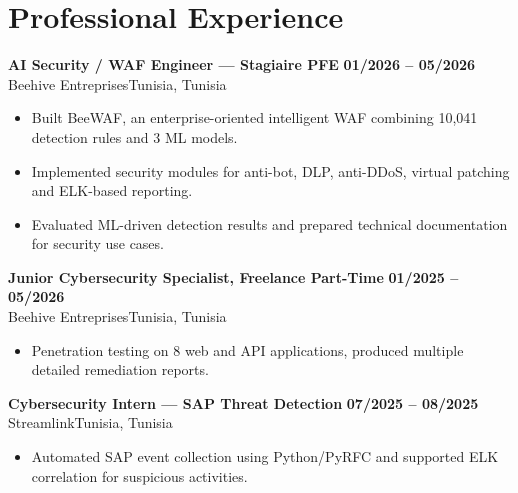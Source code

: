 \documentclass[a4paper,10pt]{article}
\newcommand{\cventry}[4]{\textbf{#1} \hfill \textbf{#4}\\[1pt]#2{\ifx\relax#3\relax\else, #3\fi}\par\vspace{2pt}}
\begin{document}
\section{Professional Experience}
\cventry{AI Security / WAF Engineer --- Stagiaire PFE}{Beehive Entreprises}{Tunisia}{01/2026 -- 05/2026}
\begin{itemize}
  \item Built BeeWAF, an enterprise-oriented intelligent WAF combining 10,041 detection rules and 3 ML models.
  \item Implemented security modules for anti-bot, DLP, anti-DDoS, virtual patching and ELK-based reporting.
  \item Evaluated ML-driven detection results and prepared technical documentation for security use cases.
\end{itemize}
\cventry{Junior Cybersecurity Specialist, Freelance Part-Time}{Beehive Entreprises}{Tunisia}{01/2025 -- 05/2026}
\begin{itemize}
  \item Penetration testing on 8 web and API applications, produced multiple detailed remediation reports.
\end{itemize}
\cventry{Cybersecurity Intern — SAP Threat Detection}{Streamlink}{Tunisia}{07/2025 -- 08/2025}
\begin{itemize}
  \item Automated SAP event collection using Python/PyRFC and supported ELK correlation for suspicious activities.
\end{itemize}
\end{document}
